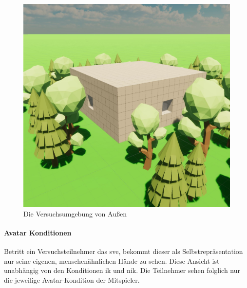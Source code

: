 \documentclass[a4paper,11pt]{article}%
\renewcommand{\\}{\vspace*{0.5\baselineskip} \newline}
\begin{document}
\begin{figure}[H]
		\begin{footnotesize}
		\centering
			\includegraphics[scale=0.4]{Abbildungen/Versuchsumgebung/Raum.JPG}
			\caption[Die Versuchsumgebung von außen]{Die Versuchsumgebung von Außen}
			\label{Versuchsumgebung}
		\end{footnotesize}
	\end{figure}

\paragraph{Avatar Konditionen}
Betritt ein Versuchsteilnehmer das \ac{sve}, bekommt dieser als Selbstrepräsentation nur seine eigenen, menschenähnlichen Hände zu sehen. Diese Ansicht ist unabhängig von den Konditionen \ac{ik} und \ac{nik}. Die Teilnehmer sehen folglich nur die jeweilige Avatar-Kondition der Mitspieler. 
\end{document}
